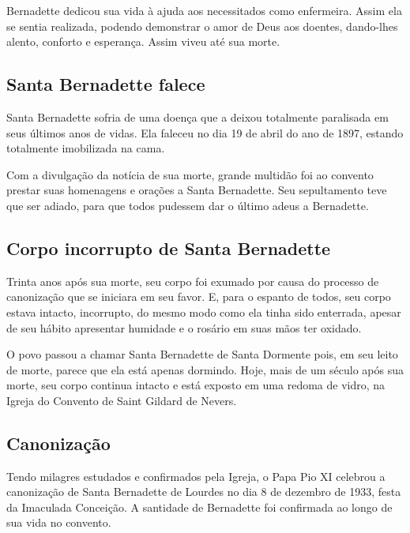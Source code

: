 \documentclass[18pt]{article}
\begin{document}
\begin{justify}
Bernadette dedicou sua vida à ajuda aos necessitados como enfermeira. Assim ela se sentia realizada, podendo demonstrar o amor de Deus aos doentes, dando-lhes alento, conforto e esperança. Assim viveu até sua morte.


\begin{justify}
\subsection{Santa Bernadette falece}
\end{justify}

Santa Bernadette sofria de uma doença que a deixou totalmente paralisada em seus últimos anos de vidas. Ela faleceu no dia 19 de abril do ano de 1897, estando totalmente imobilizada na cama.

Com a divulgação da notícia de sua morte, grande multidão foi ao convento prestar suas homenagens e orações a Santa Bernadette. Seu sepultamento teve que ser adiado, para que todos pudessem dar o último adeus a Bernadette.


\begin{justify}
\subsection{Corpo incorrupto de Santa Bernadette}
\end{justify}

Trinta anos após sua morte, seu corpo foi exumado por causa do processo de canonização que se iniciara em seu favor. E, para o espanto de todos, seu corpo estava intacto, incorrupto, do mesmo modo como ela tinha sido enterrada, apesar de seu hábito apresentar humidade e o rosário em suas mãos ter oxidado.

O povo passou a chamar Santa Bernadette de Santa Dormente pois, em seu leito de morte, parece que ela está apenas dormindo. Hoje, mais de um século após sua morte, seu corpo continua intacto e está exposto em uma redoma de vidro, na Igreja do Convento de Saint Gildard de Nevers.


\begin{justify}
\subsection{Canonização}
\end{justify}

Tendo milagres estudados e confirmados pela Igreja, o Papa Pio XI celebrou a canonização de Santa Bernadette de Lourdes no dia 8 de dezembro de 1933, festa da Imaculada Conceição. A santidade de Bernadette foi confirmada ao longo de sua vida no convento.


\end{justify}
\end{document}
